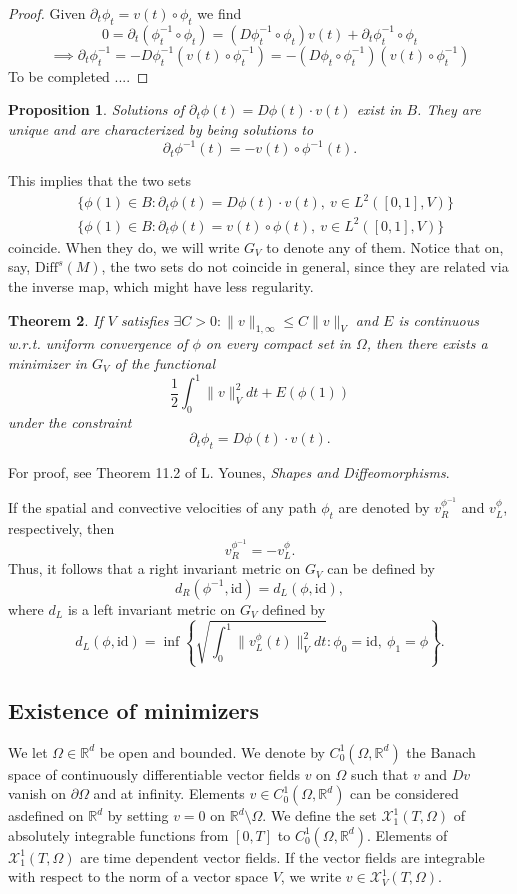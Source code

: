 \documentclass{article}
\theoremstyle{plain}
\newtheorem{teo}{Theorem}[section]
\newtheorem{prop}[teo]{Proposition}
\theoremstyle{definition}
\newcommand{\R}{\ensuremath{\mathbb{R}}}
\newcommand{\Diff}{\ensuremath{\mathrm{Diff}}}
\newcommand{\id}{\ensuremath{\mathrm{id}}}
\begin{document}
\begin{proof}
Given $\partial_t\phi_t = v(t)\circ \phi_t$ we find
\[
 0= \partial_t(\phi^{-1}_t\circ\phi_t )=\left(D\phi^{-1}_t\circ \phi_t\right) v(t)+\partial_t\phi^{-1}_t\circ\phi_t 
\]
\[
\implies \partial_t\phi^{-1}_t=-D\phi_t^{-1} \left(v(t)\circ\phi_t^{-1}\right)=-\left(D\phi_t\circ\phi_t^{-1}\right)\left(v(t)\circ\phi_t^{-1}\right)
\]
To be completed ....
\end{proof}

\begin{prop}
Solutions of $\partial_t\phi(t)=D\phi(t)\cdot v(t)$ exist in $B$. They are unique and are characterized by being solutions to 
\[
\partial_t\phi^{-1}(t)=-v(t)\circ \phi^{-1}(t).
\]
\end{prop}
This implies that the two sets
%
\begin{align*}
&\{\phi(1)\in B : \partial_t\phi(t)=D\phi(t)\cdot v(t),\ v\in L^2([0,1],V)\} \\
&\{\phi(1)\in B : \partial_t\phi(t)=v(t)\circ \phi(t),\ v\in L^2([0,1],V)\}
\end{align*}
%
coincide. When they do, we will write $G_V$ to denote any of them. Notice that on, say, $\Diff^s(M)$, the two sets do not coincide in general, since they are related via the inverse map, which might have less regularity.

\begin{teo}
If $V$ satisfies $\exists C>0: \|v\|_{1,\infty}\leq C\|v\|_V$ and $E$ is continuous w.r.t. uniform convergence of $\phi$ on every compact set in $\Omega$, then there exists a minimizer in $G_V$ of the functional 
\[
  \frac{1}{2}\int_0^1\|v\|^2_Vdt + E(\phi(1))
\]
under the constraint
\[
\partial_t\phi_t=D\phi(t)\cdot v(t).
\]
\end{teo}

For proof, see Theorem 11.2 of L. Younes, \textit{Shapes and Diffeomorphisms}.

If the spatial and convective velocities of any path $\phi_t$ are denoted by $v_R^{\phi^{-1}}$ and $v_L^\phi$, respectively, then 
\[
v_R^{\phi^{-1}}=-v_L^\phi.
\]
Thus, it follows that a right invariant metric on $G_V$ can be defined by
\[
d_R(\phi^{-1},\id)=d_L(\phi,\id),
\]
where $d_L$ is a left invariant metric on $G_V$ defined by
\[
 d_L(\phi,\id)=\inf\left\{\sqrt{\int_0^1\|v_L^\phi(t)\|_V^2 dt}: \phi_0=\id,\ \phi_1=\phi \right\}.
\]

\subsection{Existence of minimizers}
We let $\Omega\in\R^d$ be open and bounded. We denote by $C^1_0(\Omega,\R^d)$ the Banach space of continuously differentiable vector fields $v$  on $\Omega$ such that $v$ and $Dv$ vanish on $\partial\Omega$ and at infinity. Elements $v\in C^1_0(\Omega,\R^d)$ can be considered asdefined on $\R^d$ by setting $v=0$ on $\R^d\setminus\Omega$. We define the set $\mathcal{X}_1^1(T,\Omega)$ of absolutely integrable functions from $[0,T]$ to $C^1_0(\Omega,\R^d)$. Elements of $\mathcal{X}_1^1(T,\Omega)$ are time dependent vector fields. If the vector fields are integrable with respect to the norm of a vector space $V$, we write $v\in \mathcal{X}_V^1(T,\Omega)$.
\end{document}
